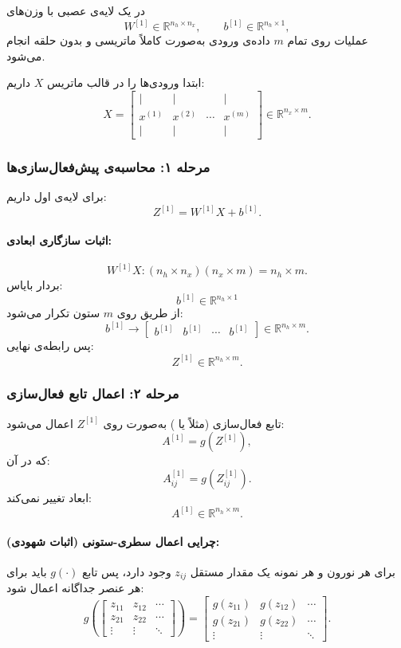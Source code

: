 \documentclass{article}
\begin{document}
در یک لایه‌ی عصبی با وزن‌های
\[
W^{[1]} \in \mathbb{R}^{n_h \times n_x}, \qquad b^{[1]} \in \mathbb{R}^{n_h \times 1},
\]
عملیات  روی تمام \( m \) داده‌ی ورودی به‌صورت کاملاً ماتریسی و بدون حلقه انجام می‌شود.

ابتدا ورودی‌ها را در قالب ماتریس \( X \) داریم:
\[
X = \begin{bmatrix}
	| & | &  & | \\
	x^{(1)} & x^{(2)} & \cdots & x^{(m)} \\
	| & | &  & |
\end{bmatrix} \in \mathbb{R}^{n_x \times m}.
\]

\subsubsection*{مرحله ۱: محاسبه‌ی پیش‌فعال‌سازی‌ها}
برای لایه‌ی اول داریم:
\[
Z^{[1]} = W^{[1]} X + b^{[1]}.
\]

\paragraph{اثبات سازگاری ابعادی:}
\[
W^{[1]} X : (n_h \times n_x)(n_x \times m) = n_h \times m.
\]
بردار بایاس:
\[
b^{[1]} \in \mathbb{R}^{n_h \times 1}
\]
از طریق  روی \( m \) ستون تکرار می‌شود:
\[
b^{[1]} \longrightarrow 
\begin{bmatrix}
	b^{[1]} & b^{[1]} & \cdots & b^{[1]}
\end{bmatrix}
\in \mathbb{R}^{n_h \times m}.
\]
پس رابطه‌ی نهایی:
\[
Z^{[1]} \in \mathbb{R}^{n_h \times m}.
\]

\subsubsection*{مرحله ۲: اعمال تابع فعال‌سازی}
تابع فعال‌سازی (مثلاً  یا ) به‌صورت  روی \( Z^{[1]} \) اعمال می‌شود:
\[
A^{[1]} = g(Z^{[1]}),
\]
که در آن:
\[
A^{[1]}_{ij} = g(Z^{[1]}_{ij}).
\]
ابعاد تغییر نمی‌کند:
\[
A^{[1]} \in \mathbb{R}^{n_h \times m}.
\]

\paragraph{چرایی اعمال سطری-ستونی (اثبات شهودی):}
برای هر نورون و هر نمونه یک مقدار مستقل \( z_{ij} \) وجود دارد، پس تابع \( g(\cdot) \) باید برای هر عنصر جداگانه اعمال شود:
\[
g\left(
\begin{bmatrix}
	z_{11} & z_{12} & \cdots \\
	z_{21} & z_{22} & \cdots \\
	\vdots & \vdots & \ddots
\end{bmatrix}
\right)
=
\begin{bmatrix}
	g(z_{11}) & g(z_{12}) & \cdots \\
	g(z_{21}) & g(z_{22}) & \cdots \\
	\vdots & \vdots & \ddots
\end{bmatrix}.
\]
\end{document}
